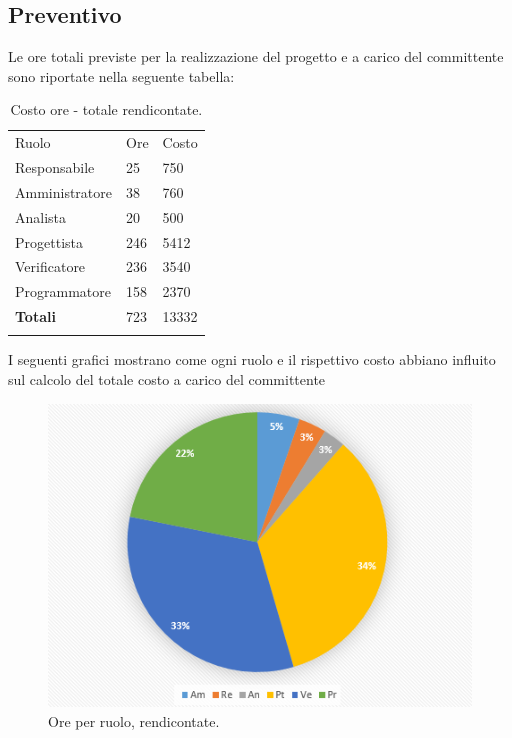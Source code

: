 \documentclass[a4paper]{report}
\begin{document}
			\subsection{Preventivo}
				Le ore totali previste per la realizzazione del progetto e a carico del committente sono riportate 
				nella seguente tabella:
				\begin{table}[H]
					\begin{tabularx}{\textwidth}{Y Y Y}
						Ruolo & Ore & Costo \\
						Responsabile & 25 & 750 \\
						Amministratore & 38 & 760 \\
						Analista & 20 & 500\\
						Progettista & 246 & 5412\\
						Verificatore & 236 & 3540\\
						Programmatore & 158 & 2370 \\
						\textbf{Totali} & 723 & 13332 \\
					\end{tabularx}
				\caption{Costo ore - totale rendicontate.}
				\label{TCRendicontati}
				\end{table}
				I seguenti grafici mostrano come ogni ruolo e il rispettivo costo abbiano influito sul calcolo del totale 
				costo a carico del committente
				\begin{figure}[H]
					\centering
					\includegraphics[scale=0.7]{PCRendicontate}
					\caption{Ore per ruolo, rendicontate.}
				\end{figure}
\end{document}
